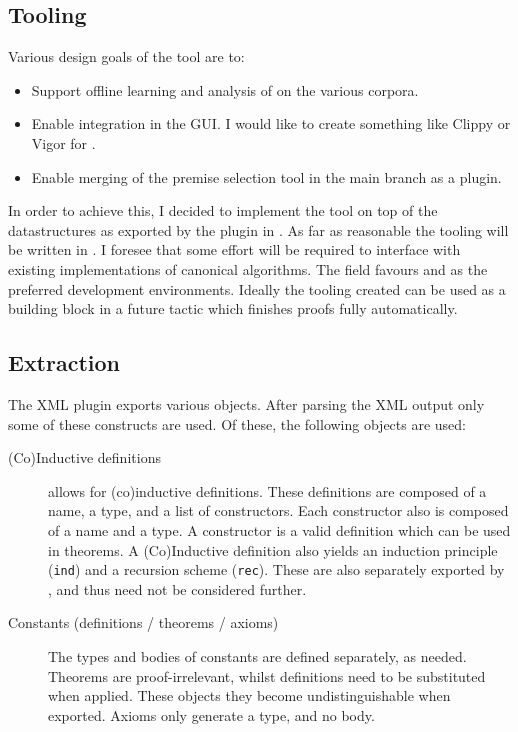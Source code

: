 \subsection{Tooling}
Various design goals of the \premiseselection tool are to:
\begin{itemize}
    \item Support offline learning and analysis of \machinelearning on the various corpora.
    \item Enable integration in the \coqide GUI.
    	I would like to create something like Clippy or Vigor for \coq.
    \item Enable merging of the premise selection tool in the \coq main branch as a plugin.
\end{itemize}
In order to achieve this, I decided to implement the tool on top of the \acic datastructures
as exported by the \xml plugin in \coq.
As far as reasonable the \premiseselection tooling will be written in \ocaml.
I foresee that some effort will be required to interface \ocaml with existing implementations
of canonical \machinelearning algorithms.
The \machinelearning field favours \python and \matlab as the preferred development environments.
Ideally the tooling created can be used as a building block in a future \coq tactic which finishes proofs fully automatically.

\subsection{Extraction}
The \coq XML plugin exports various objects.
After parsing the XML output only some of these constructs are used.
Of these, the following \coq objects are used:
\begin{description}
    \item[(Co)Inductive definitions]
        \coq allows for (co)inductive definitions.
        These definitions are composed of a name, a type, and a list of constructors.
        Each constructor also is composed of a name and a type.
        A constructor is a valid definition which can be used in theorems.
		A (Co)Inductive definition also yields an induction principle (\texttt{ind}) and a recursion scheme (\texttt{rec}).
		These are also separately exported by \coq, and thus need not be considered further.

    \item[Constants (definitions / theorems / axioms)]
        The types and bodies of constants are defined separately, as needed.
        Theorems are proof-irrelevant, whilst definitions need to be substituted when applied.
        These objects they become undistinguishable when exported.
        Axioms only generate a type, and no body.
\end{description}


